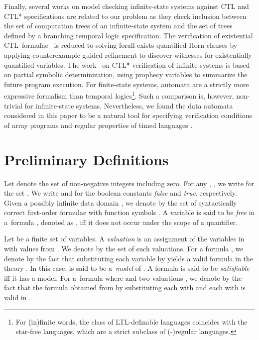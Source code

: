 \documentclass{llncs}
\begin{document}
Finally, several works on model checking infinite-state systems against CTL
\cite{existQuantHornCl:CAV13} and CTL* \cite{infStCTLstarVer:CAV15}
specifications are related to our problem as they check inclusion between the
set of computation trees of an infinite-state system and the set of trees
defined by a branching temporal logic specification. The verification of
existential CTL~formulae~\cite{existQuantHornCl:CAV13} is reduced to solving
forall-exists quantified Horn clauses by applying counterexample guided
refinement to discover witnesses for existentially quantified variables. The
work~\cite{infStCTLstarVer:CAV15} on CTL* verification of infinite systems is
based on partial symbolic determinization, using prophecy variables to summarize
the future program execution. For finite-state systems, automata are a strictly
more expressive formalism than temporal logics\footnote{For (in)finite words,
the class of LTL-definable languages coincides with the star-free languages,
which are a strict subclass of (-)regular languages.}. Such a comparison
is, however, non-trivial for infinite-state systems. Nevertheless, we found the
data automata considered in this paper to be a natural tool for specifying
verification conditions of array programs \cite{lia,lpar08,cav09} and regular
properties of timed languages \cite{AlurDill94}.

\section{Preliminary Definitions}


Let  denote the set of non-negative integers including zero. For
any , , we write  for the set
. We write  and  for the
boolean constants \emph{false} and \emph{true}, respectively. Given a
possibly infinite data domain , we denote by
 the set of syntactically
correct first-order formulae with function symbols . A
variable  is said to be \emph{free} in a~formula , denoted as
, iff it does not occur under the scope of a quantifier.

Let  be a finite set of variables. A
\emph{valuation}  is an
assignment of the variables in  with values from
. We denote by  the set of such
valuations. For a formula , we denote by  the fact that substituting each variable  by  yields a valid formula in the theory . In
this case,  is said to be a~\emph{model} of . A formula is
said to be {\em satisfiable} iff it has a model. For a~formula
 where  and two valuations ,
we denote by  the fact that the formula
obtained from  by substituting each  with  and each
 with  is valid in .
\end{document}
